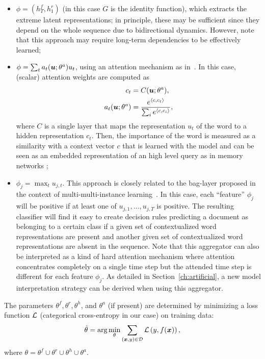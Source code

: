 \begin{itemize}
\item $\phi=(h^f_T,h^r_1)$ (in this case $G$ is the identity
  function), which extracts the extreme latent representations; in
  principle, these may be sufficient since they depend on the whole
  sequence due to bidirectional dynamics. However, note that this
  approach may require long-term dependencies to be effectively
  learned;
\item
  $\phi = \sum_t a_t(\bm{u};\theta^a) u_t$,
  using an attention mechanism as in~\cite{yang_hierarchical_2016}. In
  this case, (scalar) attention weights are computed as
  \begin{align*}
    c_t&=C(\bm{u};\theta^a),\\
    a_t(\bm{u};\theta^a) &= \frac{e^{\langle c, c_t\rangle}}
    {\sum_i{e^{\langle c, c_i\rangle}}},\\
  \end{align*}
  where $C$ is a single layer that maps the representation $u_t$ of the
  word to a hidden representation $c_t$. Then, the importance of the word is
  measured as a similarity with a context vector $c$ that is learned
  with the model and can be seen as an embedded representation of an
  high level query as in memory networks \cite{sukhbaatar2015end};
\item $\phi_j = \max_t u_{j,t}$. This approach is closely related to
  the bag-layer proposed in the context of multi-multi-instance
  learning~\cite{tibo2017network}. In this case, each ``feature''
  $\phi_j$ will be positive if at least one of $u_{j,1},\dots,u_{j,T}$
  is positive. The resulting classifier will find it easy to create
  decision rules predicting a document as belonging to a certain class
  if a given set of contextualized word representations are present
  and another given set of contextualized word representations are
  absent in the sequence. Note that this aggregator can also be
  interpreted as a kind of hard attention mechanism where attention
  concentrates completely on a single time step but the attended time
  step is different for each feature $\phi_j$. As detailed in
  Section~\ref{ch:artificial}, a new model interpretation strategy can
  be derived when using this aggregator.
\end{itemize}

The parameters $\theta^f,\theta^r,\theta^h$, and $\theta^a$ (if
present) are determined by minimizing a loss function $\mathcal{L}$
(categorical cross-entropy in our case) on training data:
\begin{equation}
  \hat \theta = \mathrm{arg}\min_\theta\sum_{(\bm{x},y)\in\mathcal{D}}\mathcal{L}\left(y,f(\bm{x})\right),
\end{equation}
where $\theta=\theta^f\cup\theta^r\cup\theta^h\cup\theta^a$.

